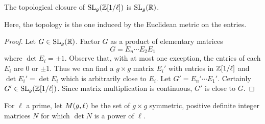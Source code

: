 \documentclass{amsart}
\begin{document}
\begin{lemma}\label{lemma:sl-z-1overl-dense-sl-r}
  The topological closure of $\operatorname{SL}_g(\mathbb{Z}[1/\ell])$ is $\operatorname{SL}_g(\mathbb{R})$.
\end{lemma}
Here, the topology is the one induced by the Euclidean metric on the entries.

\begin{proof}
  Let $G \in \operatorname{SL}_g(\mathbb{R})$. Factor $G$ as a product of elementary matrices
  \[
    G = E_n \cdots E_2 E_1
  \]
  where $\det E_i = \pm 1$. Observe that, with at most one exception, the entries of each $E_i$ are $0$ or $\pm 1$. Thus we can find a $g \times g$ matrix $E_i'$ with entries in $\mathbb{Z}[1/\ell]$ and $\det E_i' = \det E_i$ which is arbitrarily close to $E_i$. Let $G' = E_n' \cdots E_1'$. Certainly $G' \in \operatorname{SL}_g(\mathbb{Z}[1/\ell])$. Since matrix multiplication is continuous, $G'$ is close to $G$.
\end{proof}




\begin{definition}\label{def:detl}
  For $\ell$ a prime, let $M(g,\ell)$ be the set of $g \times g$ symmetric, positive definite integer matrices $N$ for which $\det N$ is a power of $\ell$.
\end{definition}
\end{document}

